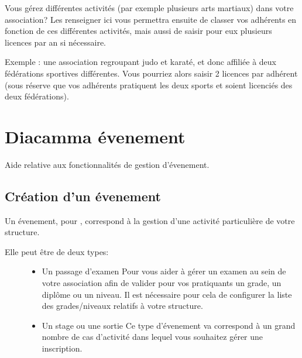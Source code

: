 \documentclass[a4paper,10pt,oneside,french]{sphinxmanual}
\begin{document}

Vous gérez différentes activités (par exemple plusieurs arts martiaux) dans votre association? Les renseigner ici vous permettra ensuite de classer vos adhérents en fonction de ces différentes activités, mais aussi de saisir pour eux plusieurs licences par an si nécessaire.

Exemple : une association regroupant judo et karaté, et donc affiliée à deux fédérations sportives différentes.
Vous pourriez alors saisir 2 licences par adhérent (sous réserve que vos adhérents pratiquent les deux sports et soient licenciés des deux fédérations).
\begin{quote}

\noindent{}
\end{quote}


\chapter{Diacamma évenement}
\label{\detokenize{event/index:diacamma-evenement}}\label{\detokenize{event/index::doc}}
Aide relative aux fonctionnalités de gestion d’évenement.


\section{Création d’un évenement}
\label{\detokenize{event/newevent:creation-d-un-evenement}}\label{\detokenize{event/newevent::doc}}
Un évenement, pour , correspond à la gestion d’une activité particulière de votre structure.
\begin{description}
\item[{Elle peut être de deux types:}] \leavevmode\begin{itemize}
\item {} 
Un passage d’examen
Pour vous aider à gérer un examen au sein de votre association afin de valider pour vos pratiquants un grade, un diplôme ou un niveau.
Il est nécessaire pour cela de configurer la liste des grades/niveaux relatifs à votre structure.

\item {} 
Un stage ou une sortie
Ce type d’évenement va correspond à un grand nombre de cas d’activité dans lequel vous souhaitez gérer une inscription.

\end{itemize}

\end{description}
\end{document}
